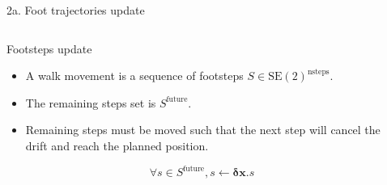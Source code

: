 \documentclass[hyperref={pdfpagelabels=false}]{beamer}
\begin{document}
\begin{frame}{2a. Foot trajectories update}

  \begin{columns}[c]
    \begin{column}{0.5\textwidth}

      \begin{block}{Footsteps update}
        \begin{itemize}
        \item A walk movement is a sequence of footsteps $S \in \text{SE}(2)^{\text{nsteps}}$.
        \item The remaining steps set is $S^{\text{future}}$.
        \item Remaining steps must be moved such that the next step
          will cancel the drift and reach the planned position.
        \end{itemize}

        \begin{equation} \label{eq:footstepmodif}
          \forall s \in S^{\text{future}}, s \gets \mathbf{\delta {x}} . s
        \end{equation}
      \end{block}

    \end{column}

    \begin{column}{0.5\textwidth}
      \vspace{4cm}
      \begin{center}
\end{center}
\end{column}
\end{columns}
\end{frame}
\end{document}
